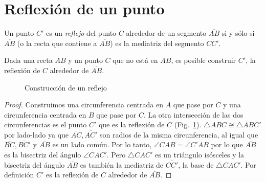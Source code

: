 
\section{Reflexión de un punto}\label{s.reflection}

\begin{definition}
Un punto $C'$ es un \emph{reflejo} del punto $C$ alrededor de un segmento $\overline{AB}$ si y sólo si $\overline{AB}$ (o la recta que contiene a $\overline{AB}$) es la mediatriz del segmento $\overline{CC'}$.
\end{definition}

\begin{theorem}\label{thm.compass-reflection}
Dada una recta $\overline{AB}$ y un punto $C$ que no está en $\overline{AB}$, es posible construir $C'$, la reflexión de $C$ alrededor de $\overline{AB}$.
\end{theorem}

\begin{figure}%
\begin{center}
\end{center}
\caption{Construcción de un reflejo}\label{f.compass-reflection}
\end{figure}

\begin{proof} 
Construimos una circunferencia centrada en $A$ que pase por $C$ y una circunferencia centrada en $B$ que pase por $C$. La otra intersección de las dos circunferencias es el punto $C'$ que es la reflexión de $C$ (Fig.~\ref{f.compass-reflection}).
$\triangle ABC \cong \triangle ABC'$ por lado-lado ya que $\overline{AC}, \overline{AC'}$ son radios de la misma circunferencia, al igual que $\overline{BC}, \overline{BC'}$ y $\overline{AB}$ es un lado común. Por lo tanto, $\angle CAB = \angle C'AB$ por lo que $\overline{AB}$ es la bisectriz del ángulo $\angle CAC'$. Pero $\triangle CAC'$ es un triángulo isósceles y la bisectriz del ángulo $\overline{AB}$ es también la mediatriz de $\overline{CC'}$, la base de $\triangle CAC'$. Por definición $C'$ es la reflexión de $C$ alrededor de $\overline{AB}$.
\end{proof}

